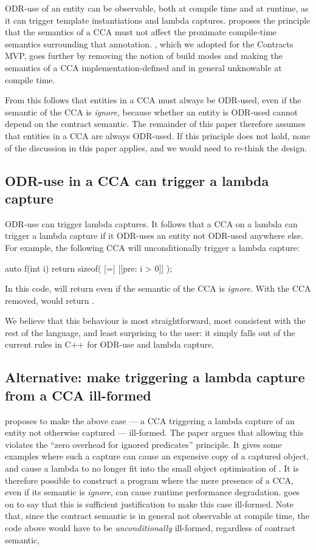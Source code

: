 ODR-use of an entity can be observable, both at compile time and at runtime, as it can trigger template instantiations and lambda captures. \cite{P2834R1} proposes the principle that the semantics of a CCA must not affect the proximate compile-time semantics surrounding that annotation. \cite{P2877R0}, which we adopted for the Contracts MVP, goes further by removing the notion of build modes and making the semantics of a CCA implementation-defined and in general unknowable at compile time.

From this follows that entities in a CCA must always be ODR-used, even if the semantic of the CCA is \emph{ignore}, because whether an entity is ODR-used cannot depend on the contract semantic. The remainder of this paper therefore assumes that entities in a CCA are always ODR-used. If this principle does not hold, none of the discussion in this paper applies, and we would need to re-think the design.

\subsection{ODR-use in a CCA can trigger a lambda capture}

ODR-use can trigger lambda captures. It follows that a CCA on a lambda can trigger a lambda capture if it ODR-uses an entity not ODR-used anywhere else. For example, the following CCA will unconditionally trigger a lambda capture:

\begin{codeblock}
auto f(int i) {
  return sizeof( [=] [[pre: i > 0]] {}); 
}
\end{codeblock}

In this code,  will return  even if the semantic of the CCA is \emph{ignore}. With the CCA removed,  would return .

We believe that this behaviour is most straightforward, most consistent with the rest of the language, and least surprising to the user: it simply falls out of the current rules in C++ for ODR-use and lambda capture.

\subsection{Alternative: make triggering a lambda capture from a CCA ill-formed}

\cite{P2834R1} proposes to make the above case --- a CCA triggering a lambda capture of an entity not otherwise captured --- ill-formed. The paper argues that allowing this violates the ``zero overhead for ignored predicates'' principle. It gives some examples where such a capture can cause an expensive copy of a captured object, and cause a lambda to no longer fit into the small object optimisation of . It is therefore possible to construct a program where the mere presence of a CCA, even if its semantic is \emph{ignore}, can cause runtime performance degradation. \cite{P2834R1} goes on to say that this is sufficient justification to make this case ill-formed. Note that, since the contract semantic is in general not observable at compile time, the code above would have to be \emph{unconditionally} ill-formed, regardless of contract semantic,

